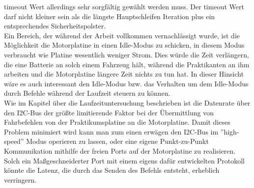 timeout Wert allerdings sehr sorgfältig gewählt werden muss. Der timeout Wert darf nicht kleiner sein
als die längste Hauptschleifen Iteration plus ein entsprechendes Sicherheitspolster.\\
Ein Bereich, der während der Arbeit vollkommen vernachlässigt wurde, ist die Möglichkeit die
Motorplatine in einen Idle-Modus zu schicken, in diesem Modus verbraucht wie Platine wesentlich weniger
Strom. Dies würde die Zeit verlängern, die eine Batterie an solch einem Fahrzeug hält, während die
Praktikanten an ihm arbeiten und die Motorplatine längere Zeit nichts zu tun hat. In dieser Hinsicht
wäre es auch interessant den Idle-Modus bzw. das Verhalten um dem Idle-Modus durch Befehle während der
Laufzeit steuern zu können.\\
Wie im Kapitel über die Laufzeituntersuchung beschrieben ist die Datenrate über den I2C-Bus der größte
limitierende Faktor bei der Übermittlung von Fahrbefehlen von der Praktikumsplatine an die
Motorplatine. Damit dieses Problem minimiert wird kann man zum einen erwägen den I2C-Bus im ''high-speed''
Modus operieren zu lassen, oder eine eigene Punkt-zu-Punkt Kommunikation mithilfe der freien Ports auf der
Motorplatine zu realisieren. Solch ein Maßgeschneiderter Port mit einem eigens dafür entwickelten Protokoll
könnte die Latenz, die durch das Senden des Befehls entsteht, erheblich verringern.
